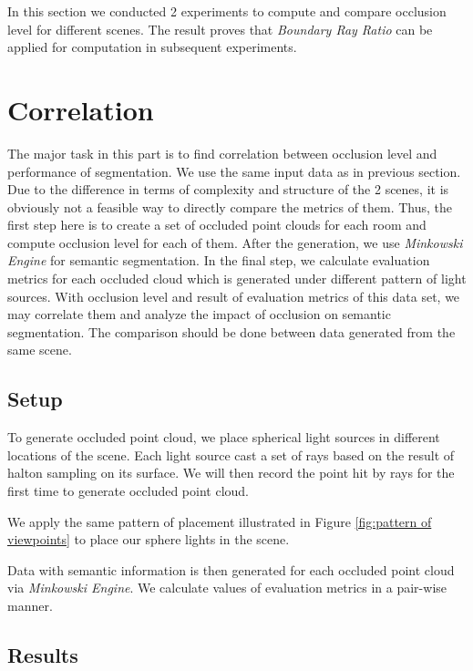 \documentclass[11pt, a4paper,oneside,chapterprefix=false]{scrbook}
\begin{document}
In this section we conducted 2 experiments to compute and compare occlusion level for different scenes. The result proves that \emph{Boundary Ray Ratio} can be applied for computation in subsequent experiments.

\section{Correlation}

The major task in this part is to find correlation between occlusion level and performance of segmentation. We use the same input data as in previous section. Due to the difference in terms of complexity and structure of the 2 scenes, it is obviously not a feasible way to directly compare the metrics of them. Thus, the first step here is to create a set of occluded point clouds for each room and compute occlusion level for each of them. After the generation, we use \emph{Minkowski Engine} for semantic segmentation. In the final step, we calculate evaluation metrics for each occluded cloud which is generated under different pattern of light sources. With occlusion level and result of evaluation metrics of this data set, we may correlate them and analyze the impact of occlusion on semantic segmentation. The comparison should be done between data generated from the same scene.

\subsection{Setup}

To generate occluded point cloud, we place spherical light sources in different locations of the scene. Each light source cast a set of rays based on the result of halton sampling on its surface. We will then record the point hit by rays for the first time to generate occluded point cloud.

\vspace{10pt}

We apply the same pattern of placement illustrated in Figure \ref{fig:pattern of viewpoints} to place our sphere lights in the scene. 

\vspace{10pt}

Data with semantic information is then generated for each occluded point cloud via \emph{Minkowski Engine}. We calculate values of evaluation metrics in a pair-wise manner.


\subsection{Results}
\end{document}
